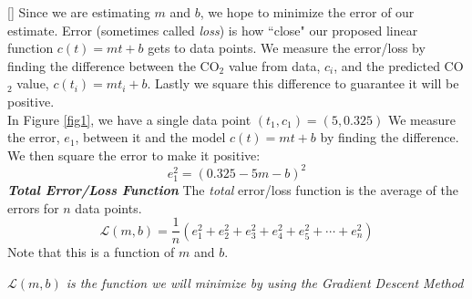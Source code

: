 \documentclass[11pt]{article}
\begin{document}
[]{
Since we are estimating $m$ and $b$, we hope to minimize the error of our estimate. Error (sometimes called {\em loss}) is  how ``close" our proposed linear function $c(t)=mt+b$ gets to  data points.  We  measure the error/loss by finding the difference between the CO$_2$ value from data, $c_i$, and the predicted CO$_2$ value, $c(t_i)=mt_i+b$.  Lastly we square this difference to guarantee it will be positive. %
}{
}\\
\example In Figure \ref{fig1}, we have a single data point $(t_1,c_1)=(5,0.325)$  We measure the error, $e_1$, between it and the model  $c(t)=mt+b$ by finding the difference.
We then square the error to make it positive:
$$e^2_1=(0.325-5m-b)^2$$
{\bf \em Total Error/Loss Function}
The {\em total} error/loss function is the average of the errors for  $n$ data points. $$\mathcal{L} (m,b)=\frac{1}{n}(e^2_1+e^2_2+e^2_3+e^2_4+e^2_5+\cdots +e^2_n)$$ Note that this is a function of $m$ and $b$. 
\begin{center}{\em $\mathcal{L} (m,b)$ is the function we will minimize  by using the Gradient Descent Method}\end{center}

 
\end{document}
